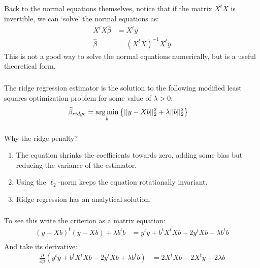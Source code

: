 \documentclass[xetex,mathserif,serif,aspectratio=169]{beamer}
\begin{document}
\begin{frame}[fragile] \frametitle{} \oldB \small

Back to the normal equations themselves, notice that if the
matrix $X^t X$ is invertible, we can `solve' the normal
equations as:
\begin{align*}
X^t X \widehat{\beta} &= X^t y \\
\widehat{\beta} &= (X^t X)^{-1} X^t y
\end{align*}
\pause This is not a good way to solve the normal equations
numerically, but is a useful theoretical form.

\end{frame}

\begin{frame}[fragile] \frametitle{} \oldB \small

\textbf{}

The ridge regression estimator is the solution to the following
modified least squares optimization problem for some value of $\lambda > 0$.
\begin{align*}
\widehat{\beta}_{ridge} &= \mathop{\mathrm{arg\,min}}_b \left\{ || y - Xb ||_2^2 + \lambda || b ||_2^2 \right\}
\end{align*}

\end{frame}

\begin{frame}[fragile] \frametitle{} \oldB \small

Why the ridge penalty?
\begin{enumerate}
\item The equation shrinks the coefficients towards zero, adding some bias but
reducing the variance of the estimator. \pause
\item Using the $\ell_2$-norm keeps the equation rotationally invariant. \pause
\item Ridge regression has an analytical solution.
\end{enumerate}

\end{frame}

\begin{frame}[fragile] \frametitle{} \oldB \small

To see this write the criterion as a matrix equation:
\begin{align*}
(y - Xb)^t (y - Xb)  + \lambda b^t b
&= y^t y + b^t X^t X b - 2 y^t X b + \lambda b^t b \\
\end{align*}
\pause And take its derivative:
\begin{align*}
\frac{\partial}{\partial \beta} \left( y^t y + b^t X^t X b - 2 y^t X b + \lambda b^t b \right)
&= 2 X^t X b - 2 X^t y + 2 \lambda b
\end{align*}

\end{frame}
\end{document}
